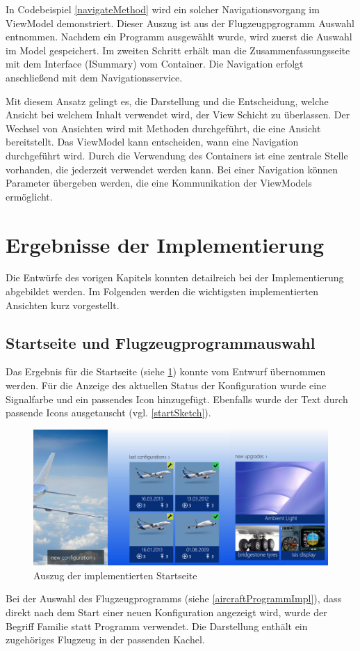 In Codebeispiel \ref{navigateMethod} wird ein solcher Navigationsvorgang im ViewModel demonstriert. Dieser Auszug ist aus der Flugzeugpgrogramm Auswahl entnommen. Nachdem ein Programm ausgewählt wurde, wird zuerst die Auswahl im Model gespeichert. Im zweiten Schritt erhält man die  Zusammenfassungsseite mit dem Interface (ISummary) vom Container. Die Navigation erfolgt anschließend mit dem Navigationsservice.
\par
Mit diesem Ansatz gelingt es, die Darstellung und die Entscheidung, welche Ansicht bei welchem Inhalt verwendet wird, der View Schicht zu überlassen. Der Wechsel von Ansichten wird mit Methoden durchgeführt, die eine Ansicht bereitstellt. Das ViewModel kann entscheiden, wann eine Navigation durchgeführt wird. Durch die Verwendung des Containers ist eine zentrale Stelle vorhanden, die jederzeit verwendet werden kann. Bei einer Navigation können Parameter übergeben werden, die eine Kommunikation der ViewModels ermöglicht. 

\section{Ergebnisse der Implementierung}
Die Entwürfe des vorigen Kapitels konnten detailreich bei der Implementierung abgebildet werden. Im Folgenden werden die wichtigsten implementierten Ansichten kurz vorgestellt.

\subsection{Startseite und Flugzeugprogrammauswahl}

Das Ergebnis für die Startseite (siehe \ref{startScreenImpl}) konnte vom Entwurf übernommen werden. Für die Anzeige des aktuellen Status der Konfiguration wurde eine Signalfarbe und ein passendes Icon hinzugefügt. Ebenfalls wurde der Text durch passende Icons ausgetauscht (vgl. \ref{startSketch}). \par
\begin{figure}
\centering
\includegraphics[width=\hsize]{images/impl/start_screen_impl}
\caption{Auszug der implementierten Startseite}
\label{startScreenImpl}
\end{figure}
Bei der Auswahl des Flugzeugprogramms (siehe \ref{aircraftProgrammImpl}), dass direkt nach dem Start einer neuen Konfiguration angezeigt wird, wurde der Begriff Familie statt Programm verwendet. Die Darstellung enthält ein zugehöriges Flugzeug  in der passenden Kachel.


